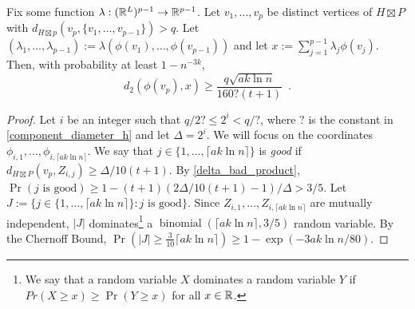 \documentclass{patmorin}
\newcommand{\defin}[1]{\emph{\textcolor{brightmaroon}{#1}}}
\begin{document}


\begin{lem}\label{crux}
  Fix some function $\lambda:(\mathbb{R}^{L})^{p-1}\to \mathbb{R}^{p-1}$. Let $v_1,\ldots,v_p$ be distinct vertices of $H\boxtimes P$ with $d_{H\boxtimes p}(v_p,\{v_1,\ldots,v_{p-1}\})> q$.  Let $(\lambda_1,\ldots,\lambda_{p-1}):=\lambda(\phi(v_1),\ldots,\phi(v_{p-1}))$ and let $x:=\sum_{j=1}^{p-1}\lambda_j\phi(v_j)$.
  Then, with probability at least $1-n^{-3k}$,
  \[
    d_2(\phi(v_p),x)\ge \frac{q\sqrt{ak\ln  n}}{160?(t+1)} \enspace
  . \]
\end{lem}

\begin{proof}
  Let $i$ be an integer such that $q/2?\le 2^i < q/?$, where $?$ is the constant in \cref{component_diameter_h} and let $\Delta=2^i$.  We will focus on the coordinates $\phi_{i,1},\ldots,\phi_{i,\lceil a k\ln n\rceil}$.  We say that $j\in\{1,\ldots,\lceil a k\ln n\rceil\}$ is \defin{good} if $d_{H\boxtimes P}(v_p,Z_{i,j})\ge \Delta/10(t+1)$.  By \cref{delta_bad_product},  $\Pr(\text{$j$ is good})\ge 1-(t+1)(2\Delta/10(t+1)-1)/\Delta > 3/5$. Let $J:=\{j\in\{1,\ldots,\lceil a k\ln n\rceil\}:\text{$j$ is good}\}$.  Since $Z_{i,1},\ldots,Z_{i,\lceil a k\ln n\rceil}$ are mutually independent, $|J|$ dominates\footnote{We say that a random variable $X$ dominates a random variable $Y$ if $Pr(X\ge x)\ge\Pr(Y\ge x)$ for all $x\in\mathbb{R}$.} a $\operatorname{binomial}(\lceil a k\ln n\rceil,3/5)$ random variable. By the Chernoff Bound, $\Pr(|J|\ge \tfrac{3}{10}\lceil a k\ln n\rceil)\ge 1-\exp(-3ak\ln n/80)$.


\end{proof}
\end{document}
